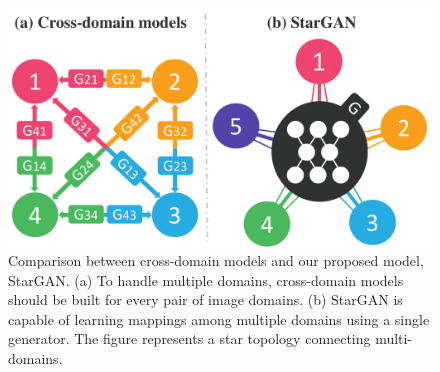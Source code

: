 \documentclass[10pt,twocolumn,letterpaper]{article}
\begin{document}


\begin{figure}[t]
\centering
\centerline{\includegraphics[width=1.0\linewidth]{images/motivation.pdf}}
\caption{Comparison between cross-domain models and our proposed model, StarGAN. (a) To handle multiple domains, cross-domain models should be built for every pair of image domains. (b) StarGAN is capable of learning mappings among multiple domains using a single generator. The figure represents a star topology connecting multi-domains.}
\label{motiv}
\end{figure}
\end{document}
